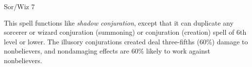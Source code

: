 
\begin{description*}
\item[Level:] Sor/Wiz 7
\end{description*}

This spell functions like \textit{shadow conjuration}, except that it can duplicate
any sorcerer or wizard conjuration (summoning) or conjuration (creation) spell
of 6th level or lower. The illusory conjurations created deal three-fifths (60\%)
damage to nonbelievers, and nondamaging effects are 60\% likely to work against
nonbelievers.